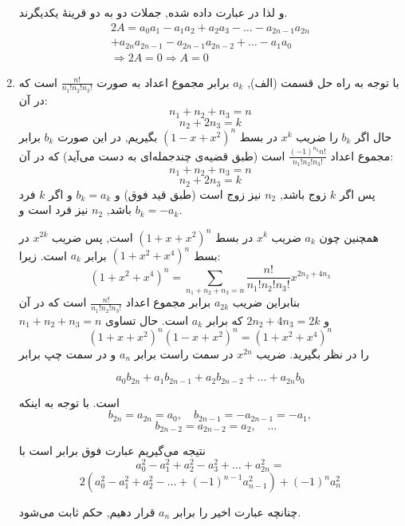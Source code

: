 \begin{enumerate}
    	و لذا در عبارت داده شده, جملات دو به دو قرینهٔ یکدیگرند.
    	\begin{align*}
    		2A = a_0a_1 - a_1a_2 + a_2a_3 - \dots - a_{2n-1}a_{2n}\\
    		+ a_{2n}a_{2n-1} - a_{2n-1}a_{2n-2} +\dots - a_1a_0 \\
    		\Rightarrow 2A = 0 \Rightarrow A = 0
    	\end{align*}
	
	\item
        \p
    	با توجه به راه حل قسمت (الف), $a_k$ برابر مجموع اعداد به صورت $\frac{n!}{n_1!n_2!n_3!}$ است که در آن:
    	$$n_1 + n_2 + n_3 = n$$ 
    	$$n_2 + 2n_3 = k$$
    	 حال اگر $b_k$ را ضریب $x^k$ در بسط $(1 - x + x^2)^n$ بگیریم, در این صورت $b_k$ برابر مجموع اعداد $\frac{(-1)^{n_2}n!}{n_1!n_2!n_3!}$ است (طبق قضیه‌ی چندجمله‌ای  به دست می‌آید) که در آن:
    	 $$n_1 + n_2 + n_3 =  n$$ 
    	 $$n_2 + 2n_3 = k$$
    	 پس اگر $k$ زوج باشد, $n_2$ نیز زوج است (طبق قید فوق) و $b_k = a_k$ و اگر $k$ فرد باشد, $n_2$ نیز فرد است و $b_k = -a_k$.
    	 
        \p
        همچنین چون $a_k$ ضریب $x^k$ در بسط $(1 + x + x^2)^n$ است, پس ضریب $x^{2k}$ در بسط $(1 + x^2 + x^4)^n$ برابر $a_k$ است. زیرا:
         $$(1+x^2+x^4)^n=\sum_{n_1+n_2+n_3=n} \frac{n!}{n_1!n_2!n_3!} x^{2n_2+4n_3}$$
         بنابراین ضریب $a_{2k}$ برابر مجموع اعداد $\frac{n!}{n_1!n_2!n_3!}$
          است که در آن\\
           $n_1+n_2+n_3=n$ و $2n_2+4n_3=2k$
           که برابر $a_k$ است. حال تساوی
        $$(1 + x + x^2)^n(1 - x + x^2)^n = (1 + x^2 + x^4)^n$$
        را در نظر بگیرید. ضریب $x^{2n}$ در سمت راست برابر $a_n$ و در سمت چپ برابر
        
        $$a_0b_{2n} + a_1b_{2n - 1} + a_2b_{2n - 2} + \dots + a_{2n}b_0$$
        
        است. با توجه به اینکه
        $$b_{2n} = a_{2n} = a_0,\quad b_{2n - 1} = -a_{2n - 1} = -a_1,$$
        $$\quad b_{2n - 2} = a_{2n - 2} = a_2,\quad \dots$$
    	
        نتیجه می‌گیریم عبارت فوق برابر است با
        $$a_0^2 - a_1^2 + a_2^2 - a_3^2 + \dots + a_{2n}^2 = $$
        $$2(a_0^2 - a_1^2 + a_2^2 - \dots + (-1)^{n - 1}a_{n - 1}^2) + (-1)^n a_n^2$$
    	
        چنانچه عبارت اخیر را برابر $a_n$ قرار دهیم, حکم ثابت می‌شود.
        
        
	\end{enumerate}
